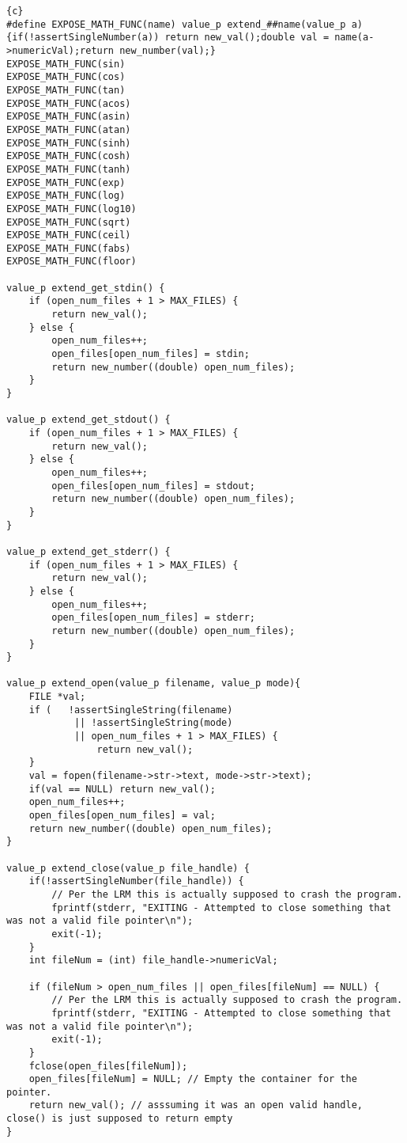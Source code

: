 \begin{lstlisting}{c}
#define EXPOSE_MATH_FUNC(name) value_p extend_##name(value_p a){if(!assertSingleNumber(a)) return new_val();double val = name(a->numericVal);return new_number(val);}
EXPOSE_MATH_FUNC(sin)
EXPOSE_MATH_FUNC(cos)
EXPOSE_MATH_FUNC(tan)
EXPOSE_MATH_FUNC(acos)
EXPOSE_MATH_FUNC(asin)
EXPOSE_MATH_FUNC(atan)
EXPOSE_MATH_FUNC(sinh)
EXPOSE_MATH_FUNC(cosh)
EXPOSE_MATH_FUNC(tanh)
EXPOSE_MATH_FUNC(exp)
EXPOSE_MATH_FUNC(log)
EXPOSE_MATH_FUNC(log10)
EXPOSE_MATH_FUNC(sqrt)
EXPOSE_MATH_FUNC(ceil)
EXPOSE_MATH_FUNC(fabs)
EXPOSE_MATH_FUNC(floor)

value_p extend_get_stdin() {
	if (open_num_files + 1 > MAX_FILES) {
		return new_val();
	} else {
		open_num_files++;
		open_files[open_num_files] = stdin;
		return new_number((double) open_num_files);
	}
}

value_p extend_get_stdout() {
	if (open_num_files + 1 > MAX_FILES) {
		return new_val();
	} else {
		open_num_files++;
		open_files[open_num_files] = stdout;
		return new_number((double) open_num_files);
	}
}

value_p extend_get_stderr() {
	if (open_num_files + 1 > MAX_FILES) {
		return new_val();
	} else {
		open_num_files++;
		open_files[open_num_files] = stderr;
		return new_number((double) open_num_files);
	}
}

value_p extend_open(value_p filename, value_p mode){
	FILE *val;
	if (   !assertSingleString(filename)
			|| !assertSingleString(mode)
			|| open_num_files + 1 > MAX_FILES) {
				return new_val();
	}
	val = fopen(filename->str->text, mode->str->text);
	if(val == NULL) return new_val();
	open_num_files++;
	open_files[open_num_files] = val;
	return new_number((double) open_num_files);
}

value_p extend_close(value_p file_handle) {
	if(!assertSingleNumber(file_handle)) {
		// Per the LRM this is actually supposed to crash the program.
		fprintf(stderr, "EXITING - Attempted to close something that was not a valid file pointer\n");
		exit(-1);
	}
	int fileNum = (int) file_handle->numericVal;

	if (fileNum > open_num_files || open_files[fileNum] == NULL) {
		// Per the LRM this is actually supposed to crash the program.
		fprintf(stderr, "EXITING - Attempted to close something that was not a valid file pointer\n");
		exit(-1);
	}
	fclose(open_files[fileNum]);
	open_files[fileNum] = NULL; // Empty the container for the pointer.
	return new_val(); // asssuming it was an open valid handle, close() is just supposed to return empty
}


\end{lstlisting}
